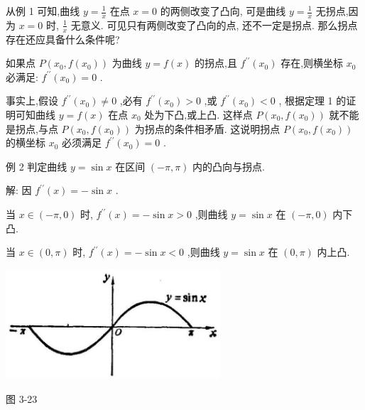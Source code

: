 \documentclass[lang=cn,newtx,12pt,scheme=chinese]{elegantbook}
\begin{document}
从例 1 可知,曲线 \(y = \frac{1}{x}\) 在点 \(x = 0\) 的两侧改变了凸向, 可是曲线 \(y = \frac{1}{x}\) 无拐点,因为 \(x = 0\) 时, \(\frac{1}{x}\) 无意义. 可见只有两侧改变了凸向的点, 还不一定是拐点. 那么拐点存在还应具备什么条件呢?

\begin{property}
如果点 \(P\left( {{x}_{0},f\left( {x}_{0}\right) }\right)\) 为曲线 \(y = f\left( x\right)\) 的拐点,且 \({f}^{\prime \prime }\left( {x}_{0}\right)\) 存在,则横坐标 \({x}_{0}\) 必满足: \({f}^{\prime \prime }\left( {x}_{0}\right) = 0\) .
\end{property}

事实上,假设 \({f}^{\prime \prime }\left( {x}_{0}\right) \neq 0\) ,必有 \({f}^{\prime \prime }\left( {x}_{0}\right) > 0\) ,或 \({f}^{\prime \prime }\left( {x}_{0}\right) < 0\) , 根据定理 1 的证明可知曲线 \(y = f\left( x\right)\) 在点 \({x}_{0}\) 处为下凸,或上凸. 这样点 \(P\left( {{x}_{0},f\left( {x}_{0}\right) }\right)\) 就不能是拐点,与点 \(P\left( {{x}_{0},f\left( {x}_{0}\right) }\right)\) 为拐点的条件相矛盾. 这说明拐点 \(P\left( {{x}_{0},f\left( {x}_{0}\right) }\right)\) 的横坐标 \({x}_{0}\) 必须满足 \({f}^{\prime \prime }\left( {x}_{0}\right) = 0\) .

例 2 判定曲线 \(y = \sin x\) 在区间 \(\left( {-\pi ,\pi }\right)\) 内的凸向与拐点.

解: 因 \({f}^{\prime \prime }\left( x\right) = - \sin x\) .

当 \(x \in \left( {-\pi ,0}\right)\) 时, \({f}^{\prime \prime }\left( x\right) = - \sin x > 0\) ,则曲线 \(y = \sin x\) 在 \(\left( {-\pi ,0}\right)\) 内下凸.

当 \(x \in \left( {0,\pi }\right)\) 时, \({f}^{\prime \prime }\left( x\right) = - \sin x < 0\) ,则曲线 \(y = \sin x\) 在 \(\left( {0,\pi }\right)\) 内上凸.

\begin{center}
\includegraphics[max width=0.6\textwidth]{images/01912c18-5c3f-733d-b775-749ba9897a9d_169_891522.jpg}
\end{center}

图 3-23
\end{document}
